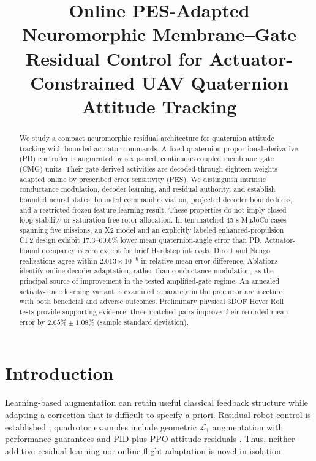 \documentclass[letterpaper,10pt,conference]{IEEEtran}
\title{Online PES-Adapted Neuromorphic Membrane--Gate Residual Control for
Actuator-Constrained UAV Quaternion Attitude Tracking}
\author{%
\IEEEauthorblockN{Gandhi Contreras\IEEEauthorrefmark{1}, Steven Sandoval\IEEEauthorrefmark{1}, Luis Garcia\IEEEauthorrefmark{2}}%
\IEEEauthorblockA{\IEEEauthorrefmark{1}New Mexico State University (NMSU), Las Cruces, NM, USA}%
\IEEEauthorblockA{\IEEEauthorrefmark{2}U.S. Air Force, Los Alamos, NM, USA}%
}
\begin{document}
\maketitle
\thispagestyle{empty}
\pagestyle{empty}

\begin{abstract}
We study a compact neuromorphic residual architecture for quaternion
attitude tracking with bounded actuator commands. A fixed quaternion
proportional--derivative (PD) controller is augmented by six paired,
continuous coupled membrane--gate (CMG) units. Their gate-derived activities
are decoded through eighteen weights adapted online by prescribed error
sensitivity (PES). We distinguish intrinsic conductance modulation,
decoder learning, and residual authority, and establish bounded neural
states, bounded command deviation, projected decoder boundedness, and a
restricted frozen-feature learning result. These properties do not imply
closed-loop stability or saturation-free rotor allocation. In ten matched
45-s MuJoCo cases spanning five missions, an X2 model and an explicitly
labeled enhanced-propulsion CF2 design exhibit 17.3--60.6\% lower mean
quaternion-angle error than PD. Actuator-bound occupancy is zero except
for brief Hardstep intervals. Direct and Nengo realizations agree within
$2.013\times10^{-6}$ in relative mean-error difference. Ablations identify
online decoder adaptation, rather than conductance modulation, as the
principal source of improvement in the tested amplified-gate regime.
An annealed activity-trace learning variant is examined separately in the
precursor architecture, with both beneficial and adverse outcomes.
Preliminary physical 3DOF Hover Roll tests provide supporting evidence:
three matched pairs improve their recorded mean error by
$2.65\%\pm1.08\%$ (sample standard deviation).
\end{abstract}

\section{Introduction}
Learning-based augmentation can retain useful classical feedback structure
while adapting a correction that is difficult to specify a priori.
Residual robot control is established \cite{johannink2019}; quadrotor
examples include geometric $\mathcal L_1$ augmentation with performance
guarantees \cite{wu2025l1quad} and PID-plus-PPO attitude residuals
\cite{li2027hpappo}. Thus, neither additive residual learning nor online
flight adaptation is novel in isolation.
\end{document}
